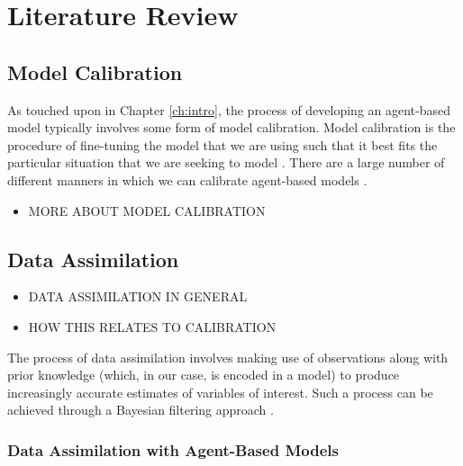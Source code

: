 \chapter{Literature Review}\label{ch:lit_rev}

\section{Model Calibration}\label{sec:lit_rev:calibration}

As touched upon in Chapter \ref{ch:intro}, the process of developing an
agent-based model typically involves some form of model calibration.
Model calibration is the procedure of fine-tuning the model that we are using
such that it best fits the particular situation that we are seeking to model
\citep{crooks2012introduction}.
There are a large number of different manners in which we can calibrate
agent-based models \citep{thiele2014facilitating}.

\begin{itemize}
    \item MORE ABOUT MODEL CALIBRATION
\end{itemize}

\section{Data Assimilation}\label{sec:lit_rev:da}

\begin{itemize}
    \item DATA ASSIMILATION IN GENERAL
    \item HOW THIS RELATES TO CALIBRATION
\end{itemize}

The process of data assimilation involves making use of observations along with
prior knowledge (which, in our case, is encoded in a model) to produce
increasingly accurate estimates of variables of interest.
Such a process can be achieved through a Bayesian filtering approach
\citep{grewal1995kalman}.

\subsection{Data Assimilation with Agent-Based Models}\label{sub:lit_rev:da:abm}

